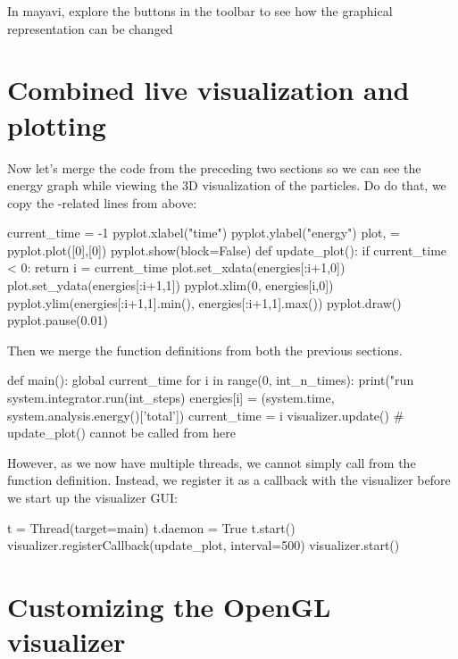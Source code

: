 \documentclass[
paper=a4,                       %
fontsize=11pt,                  %
twoside,                        %
footsepline,                    %
headsepline,                    %
headinclude=false,              %
footinclude=false,              %
pagesize,                       %
]{scrartcl}
\begin{document}
In mayavi, explore the buttons in the toolbar to see how the graphical representation can be changed

\section{Combined live visualization and plotting}

Now let's merge the code from the preceding two sections so we can see the energy graph while viewing the 3D visualization of the particles.
Do do that, we copy the -related lines from above:

\begin{pypresso}
current_time = -1
pyplot.xlabel("time")
pyplot.ylabel("energy")
plot, = pyplot.plot([0],[0])
pyplot.show(block=False)
def update_plot():
    if current_time < 0:
        return
    i = current_time
    plot.set_xdata(energies[:i+1,0])
    plot.set_ydata(energies[:i+1,1])
    pyplot.xlim(0, energies[i,0])
    pyplot.ylim(energies[:i+1,1].min(), energies[:i+1,1].max())
    pyplot.draw()
    pyplot.pause(0.01)
\end{pypresso}

Then we merge the  function definitions from both the previous sections.

\begin{pypresso}
def main():
    global current_time
    for i in range(0, int_n_times):
        print("run %
        system.integrator.run(int_steps)
        energies[i] = (system.time, system.analysis.energy()['total'])
        current_time = i
        visualizer.update()
        # update_plot() cannot be called from here
\end{pypresso}

However, as we now have multiple threads, we cannot simply call  from the  function definition.
Instead, we register it as a callback with the visualizer before we start up the visualizer GUI:

\begin{pypresso}
t = Thread(target=main)
t.daemon = True
t.start()
visualizer.registerCallback(update_plot, interval=500)
visualizer.start()
\end{pypresso}

\section{Customizing the OpenGL visualizer}
\end{document}
